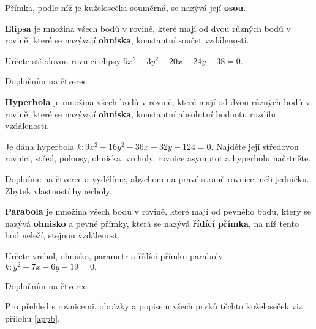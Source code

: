 \begin{definition}
    Přímka, podle níž je kuželosečka souměrná, se nazývá její \textbf{osou}.
\end{definition}

\begin{definition}
\textbf{Elipsa} je množina všech bodů v rovině, které mají od dvou různých bodů v rovině,
které se nazývají \textbf{ohniska}, konstantní součet vzdálenosti.
\end{definition}

\begin{priklad}
Určete středovou rovnici elipsy $5x^2+3y^2+20x-24y+38=0.$
\end{priklad}

\begin{reseni}
Doplněním na čtverec.
\end{reseni}

\begin{definition}
\textbf{Hyperbola} je množina všech bodů v rovině, které mají od dvou různých
bodů v rovině, které se nazývají \textbf{ohniska}, konstantní absolutní
hodnotu rozdílu vzdálenosti.
\end{definition}

\begin{priklad}
Je dána hyperbola $k:9x^2-16y^2-36x+32y-124=0.$ Najděte její středovou rovnici,
střed, poloosy, ohniska, vrcholy, rovnice asymptot a hyperbolu načrtněte.
\end{priklad}

\begin{reseni}
Doplníme na čtverec a vydělíme, abychom na pravé straně rovnice měli jedničku.
Zbytek vlastností hyperboly.
\end{reseni}

\begin{definition}
\textbf{Parabola} je množina všech bodů v rovině, které mají od pevného bodu, který
se nazývá \textbf{ohnisko} a pevné přímky, která se nazývá \textbf{řídící přímka},
na níž tento bod neleží, stejnou vzdálenost.
\end{definition}

\begin{priklad}
Určete vrchol, ohnisko, parametr a řídící přímku paraboly $k:y^2-7x-6y-19=0.$
\end{priklad}

\begin{reseni}
Doplněním na čtverec.
\end{reseni}

\begin{pozn}
    Pro přehled s rovnicemi, obrázky a popisem všech prvků těchto kuželoseček
    viz přílohu \ref{appb}.
\end{pozn}

